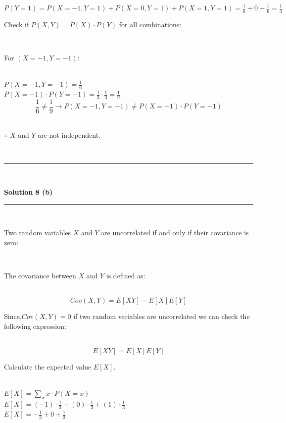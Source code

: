 \documentclass{article}
\begin{document}
$P(Y = 1) = P(X = -1, Y = 1) + P(X = 0, Y = 1) + P(X = 1, Y = 1) = \frac{1}{6} + 0 + \frac{1}{6} = \frac{1}{3}$\\


\parbox{\textwidth}{Check if $P(X , Y) = P(X) \cdot P(Y)$ for all combinations:}\\

\parbox{\textwidth}{For $(X = -1, Y = -1)$:}\\

$P(X = -1, Y = -1) = \frac{1}{6}$\\

$P(X = -1) \cdot P(Y = -1) = \frac{1}{3} \cdot \frac{1}{3} = \frac{1}{9}$\\

$$ \frac{1}{6} \neq \frac{1}{9} \rightarrow P(X = -1, Y = -1) \neq P(X = -1) \cdot P(Y = -1)$$\\

\parbox{\textwidth}{$\therefore$ $X$ and $Y$ are not independent.}\\

\noindent\rule{\textwidth}{0.4pt}\\

\newpage

\textbf{Solution 8 (b)}

\noindent\rule{\textwidth}{0.4pt}\\

\parbox{\textwidth}{Two random variables $X$ and $Y$ are uncorrelated if and only if their covariance is zero:}\\

\parbox{\textwidth}{The covariance between $X$ and $Y$ is defined as:}\\

$$Cov(X,Y) = E[XY] - E[X]E[Y]$$

\parbox{\textwidth}{Since,$Cov(X,Y) = 0$ if two random variables are uncorrelated we can check the following expression:}\\

$$E[XY] = E[X]E[Y]$$

\parbox{\textwidth}{Calculate the expected value $E[X]$.}\\

$E[X] = \sum_{x} x \cdot P(X = x)$\\

$E[X] = (-1) \cdot \frac{1}{3} + (0) \cdot \frac{1}{3} + (1) \cdot \frac{1}{3}$\\

$E[X] = -\frac{1}{3} + 0 + \frac{1}{3}$\\
\end{document}
